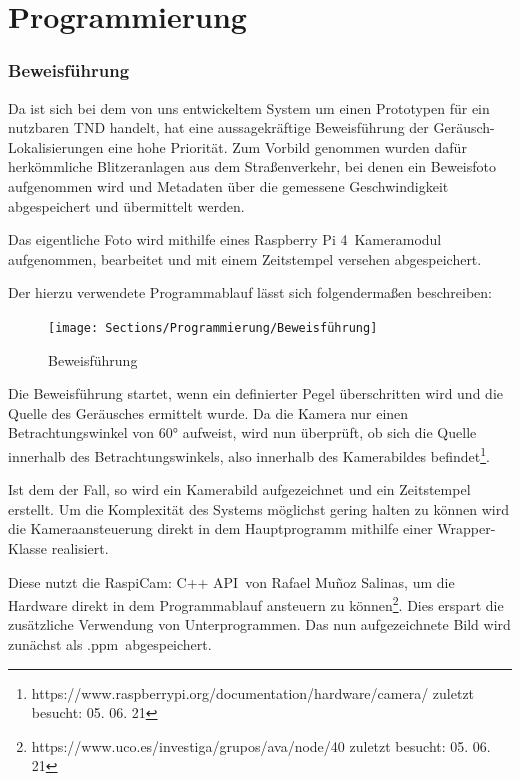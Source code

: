 \section{Programmierung}

\subsubsection{Beweisführung}

Da ist sich bei dem von uns entwickeltem System um einen Prototypen für ein nutzbaren TND handelt, hat eine aussagekräftige Beweisführung der Geräusch-Lokalisierungen eine hohe Priorität. Zum Vorbild genommen wurden dafür herkömmliche Blitzeranlagen aus dem Straßenverkehr, bei denen ein Beweisfoto aufgenommen wird und Metadaten über die gemessene Geschwindigkeit abgespeichert und übermittelt werden.

Das eigentliche Foto wird mithilfe eines \glqq Raspberry Pi 4\grqq\ Kameramodul aufgenommen, bearbeitet und mit einem Zeitstempel versehen abgespeichert. 

Der hierzu verwendete Programmablauf lässt sich folgendermaßen beschreiben: 

\begin{figure}[h]
	\begin{center}
		\texttt{[image: Sections/Programmierung/Beweisführung]}
	\end{center}
	\caption{Beweisführung}
	\label{fig:Beweisführung}
\end{figure}

Die Beweisführung startet, wenn ein definierter Pegel überschritten wird und die Quelle des Geräusches ermittelt wurde. Da die Kamera nur einen Betrachtungswinkel von \ang{60} aufweist, wird nun überprüft, ob sich die Quelle innerhalb des Betrachtungswinkels, also innerhalb des Kamerabildes befindet\footnote{https://www.raspberrypi.org/documentation/hardware/camera/ zuletzt besucht: 05. 06. 21}.

Ist dem der Fall, so wird ein Kamerabild aufgezeichnet und ein Zeitstempel erstellt. Um die Komplexität des Systems möglichst gering halten zu können wird die Kameraansteuerung direkt in dem Hauptprogramm mithilfe einer Wrapper-Klasse realisiert. 

Diese nutzt die \glqq RaspiCam: C++ API\grqq\ von Rafael Muñoz Salinas, um die Hardware direkt in dem Programmablauf ansteuern zu können\footnote{https://www.uco.es/investiga/grupos/ava/node/40 zuletzt besucht: 05. 06. 21}. Dies erspart die zusätzliche Verwendung von Unterprogrammen. Das nun aufgezeichnete Bild wird zunächst als \glqq .ppm\grqq\ abgespeichert. 

